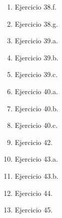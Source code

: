 \begin{enumerate}
    \item Ejercicio 38.f.
    \item Ejercicio 38.g.
    \item Ejercicio 39.a.
    \item Ejercicio 39.b.
    \item Ejercicio 39.c.
    \item Ejercicio 40.a.
    \item Ejercicio 40.b.
    \item Ejercicio 40.c.
    \item Ejercicio 42.
    \item Ejercicio 43.a.
    \item Ejercicio 43.b.
    \item Ejercicio 44.
    \item Ejercicio 45.
    
\end{enumerate}

